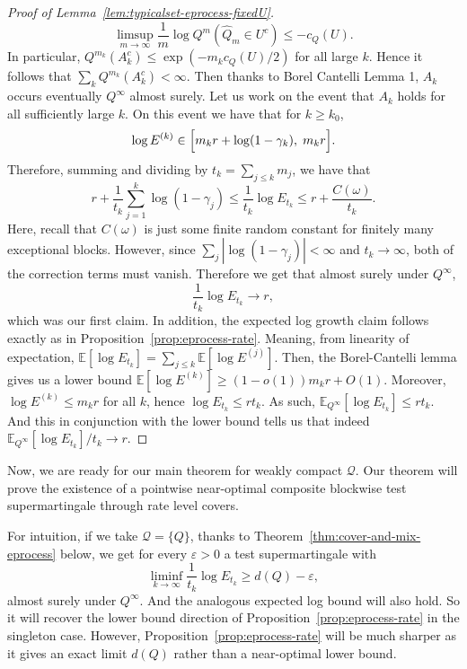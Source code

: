 \documentclass[11pt]{article}
\newcommand{\E}{\mathbb{E}}
\newcommand{\Pcal}{\mathcal{P}}
\newcommand{\Qcal}{\mathcal{Q}}
\theoremstyle{definition}
\theoremstyle{definition}
\begin{document}
\begin{proof}[Proof of Lemma~\ref{lem:typicalset-eprocess-fixedU}]
\[
\limsup_{m\to\infty}\frac{1}{m}\log Q^{m}(\widehat Q_m\in U^c) \le -c_Q(U).
\]
In particular, $Q^{m_k}(A_k^c)\le \exp(-m_k c_Q(U)/2)$ for all large $k$. Hence it follows that $\sum_k Q^{m_k}(A_k^c)<\infty$. Then thanks to Borel Cantelli Lemma 1, $A_k$ occurs eventually $Q^\infty$ almost surely. Let us work on the event that $A_k$ holds for all sufficiently large $k$. On this event we have that for $k\ge k_0$,
\[
\log E^{(k)}\in\Bigl[m_kr+\log(1-\gamma_k),\; m_kr\Bigr].
\]
Therefore, summing and dividing by $t_k=\sum_{j\le k}m_j$, we have that
\[
r+\frac{1}{t_k}\sum_{j=1}^k\log(1-\gamma_j)\le \frac{1}{t_k}\log E_{t_k} \le r+\frac{C(\omega)}{t_k}.
\]
Here, recall that $C(\omega)$ is just some finite random constant for finitely many exceptional blocks. However, since $\sum_j|\log(1-\gamma_j)|<\infty$ and $t_k\to\infty$, both of the correction terms must vanish. Therefore we get that almost surely under $Q^\infty$,
\[
\frac{1}{t_k}\log E_{t_k} \to r,
\]
which was our first claim. In addition, the expected log growth claim follows exactly as in Proposition~\ref{prop:eprocess-rate}. Meaning, from linearity of expectation, $\E[\log E_{t_k}]=\sum_{j\le k}\E[\log E^{(j)}]$. Then, the Borel-Cantelli lemma gives us a lower bound $\E[\log E^{(k)}]\ge (1-o(1))m_kr+O(1)$. Moreover, $\log E^{(k)}\le m_k r$ for all $k$, hence $\log E_{t_k}\le rt_k$. As such, $\E_{Q^\infty}[\log E_{t_k}]\le rt_k$. And this in conjunction with the lower bound tells us that indeed $\E_{Q^\infty}[\log E_{t_k}]/t_k\to r$.
\end{proof}

\noindent Now, we are ready for our main theorem for weakly compact $\Qcal$. Our theorem will prove the existence of a pointwise near-optimal composite blockwise test supermartingale through rate level covers.

For intuition, if we take $\Qcal=\{Q\}$, thanks to Theorem~\ref{thm:cover-and-mix-eprocess} below, we get for every $\varepsilon>0$ a test supermartingale with
\[
\liminf_{k\to\infty}\frac{1}{t_k}\log E_{t_k} \ge d(Q)-\varepsilon,
\]
almost surely under $Q^{\infty}$. And the analogous expected log bound will also hold. So it will recover the lower bound direction of Proposition~\ref{prop:eprocess-rate} in the singleton case. However, Proposition~\ref{prop:eprocess-rate} will be much sharper as it gives an exact limit $d(Q)$ rather than a near-optimal lower bound.
\end{document}
